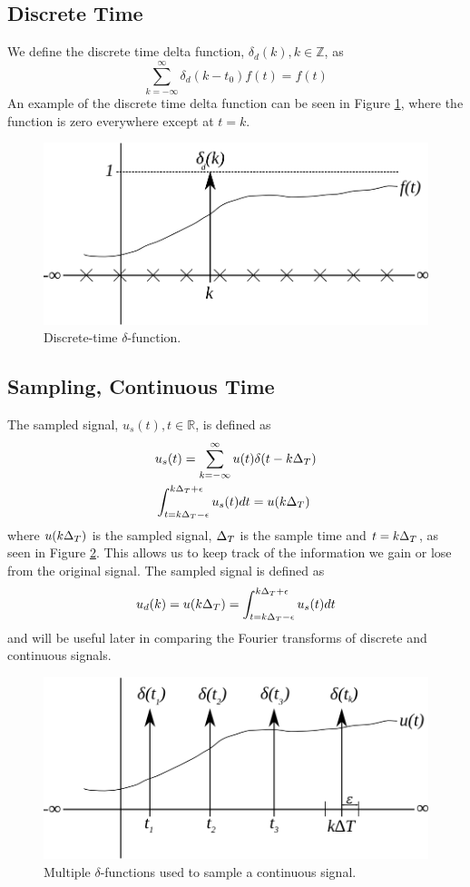 \subsection{Discrete Time}
We define the discrete time delta function, $\delta_d(k), k \in \mathbb{Z}$, as
$$\sum_{k=-\infty}^\infty \delta_d(k-t_0)f(t) = f(t)$$
An example of the discrete time delta function can be seen in Figure \ref{fig:02discDeltaFn}, where the function is zero everywhere except at $t=k$.
\begin{figure}[ht!]
	\centering
	\includegraphics[width=.5\textwidth]{images/02discDeltaFn}
	\caption{Discrete-time $\delta$-function.}
	\label{fig:02discDeltaFn}
\end{figure}

\subsection{Sampling, Continuous Time}
The sampled signal, $u_s(t), t \in \mathbb{R}$, is defined as
\begin{align*}
&u_s(t) = \sum_{k=-\infty}^\infty u(t)\delta(t-k\Delta_T) \\
&\int_{t=k\Delta_T-\epsilon}^{k\Delta_T+\epsilon} u_s(t)dt = u(k\Delta_T)
\end{align*}
where $u(k\Delta_T)$ is the sampled signal, $\Delta_T$ is the sample time and $t=k\Delta_T$, as seen in Figure \ref{fig:02samplingDeltaFn}. This allows us to keep track of the information we gain or lose from the original signal. The sampled signal is defined as
$$u_d(k) = u(k\Delta_T) = \int_{t=k\Delta_T-\epsilon}^{k\Delta_T+\epsilon} u_s(t)dt$$
and will be useful later in comparing the Fourier transforms of discrete and continuous signals.
\begin{figure}[ht!]
	\centering
	\includegraphics[width=.5\textwidth]{images/02samplingDeltaFn}
	\caption{Multiple $\delta$-functions used to sample a continuous signal.}
	\label{fig:02samplingDeltaFn}
\end{figure}

